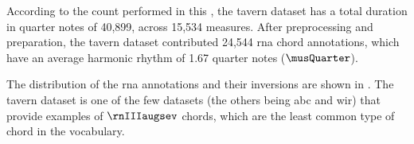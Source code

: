 
According to the count performed in this \thesisdiss{}, the
\gls{tavern} dataset has a total duration in quarter notes
of 40,899, across 15,534 measures. After preprocessing and
preparation, the \gls{tavern} dataset contributed 24,544
\gls{rna} chord annotations, which have an average harmonic
rhythm of 1.67 quarter notes ($\musQuarter$).

The distribution of the \gls{rna} annotations and their
inversions are shown in . The
\gls{tavern} dataset is one of the few datasets (the others
being \gls{abc} and \gls{wir}) that provide examples of
$\rnIIIaugsev$ chords, which are the least common type of
chord in the vocabulary.



